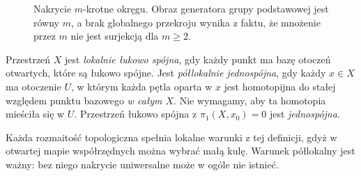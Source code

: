 \begin{figure}[!htbp]
\centering
{}
\caption{Nakrycie $m$-krotne okręgu. Obraz generatora
grupy podstawowej jest równy $m$, a brak globalnego przekroju
wynika z faktu, że mnożenie przez $m$ nie jest surjekcją dla $m\geq2$.}
\label{fig:nakrycie-m-arkuszy}
\end{figure}

\begin{definicja}
\label{def:semilokalnie-prosto-spojna}
Przestrzeń $X$ jest \emph{lokalnie łukowo spójna},
gdy każdy punkt ma bazę otoczeń otwartych,
które są łukowo spójne. Jest
\emph{półlokalnie jednospójna}, gdy każdy
$x\in X$ ma otoczenie $U$, w którym
każda pętla oparta w $x$ jest homotopijna do stałej
względem punktu bazowego \emph{w całym $X$}. Nie wymagamy, aby
ta homotopia mieściła się w $U$.
Przestrzeń łukowo spójna z
$\pi_1(X,x_0)=0$ jest \emph{jednospójna}.
\end{definicja}

Każda rozmaitość topologiczna spełnia
lokalne warunki z tej definicji, gdyż
w otwartej mapie współrzędnych można
wybrać małą kulę. Warunek półlokalny
jest ważny: bez niego nakrycie uniwersalne
może w ogóle nie istnieć.

